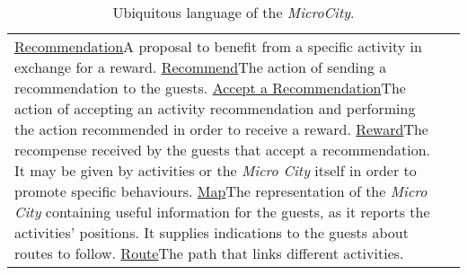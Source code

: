 \begin{longtable}{|l|p{}|}
	\ul{Recommendation}{A proposal to benefit from a specific activity in exchange for a reward.}
	\ul{Recommend}{The action of sending a recommendation to the guests.}
	\ul{Accept a Recommendation}{The action of accepting an activity recommendation and performing the action recommended in order to receive a reward.}
	\ul{Reward}{The recompense received by the guests that accept a recommendation. It may be given by activities or the \textit{Micro City} itself in order to promote specific behaviours.}
	\ul{Map}{The representation of the \textit{Micro City} containing useful information for the guests, as it reports the activities' positions. It supplies indications to the guests about routes to follow.}
	\ul{Route}{The path that links different activities.}
	\caption{Ubiquitous language of the \textit{MicroCity}.}
	\label{tab:ul}
\end{longtable}
